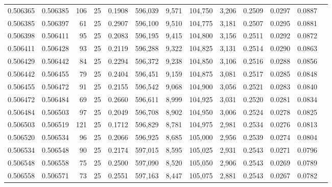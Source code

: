 \begin{tabular}{rrrrrrrrrrrrr}
0.506365 & 0.506385 & 106 &  25 &                                     0.1908 & 596,039 &   9,571 & 104,750 &   3,206 & 0.2509 & 0.0297 & 0.0887 \\
0.506385 & 0.506397 &  61 &  25 &                                     0.2907 & 596,100 &   9,510 & 104,775 &   3,181 & 0.2507 & 0.0295 & 0.0881 \\
0.506398 & 0.506411 &  95 &  25 &                                     0.2083 & 596,195 &   9,415 & 104,800 &   3,156 & 0.2511 & 0.0292 & 0.0872 \\
0.506411 & 0.506428 &  93 &  25 &                                     0.2119 & 596,288 &   9,322 & 104,825 &   3,131 & 0.2514 & 0.0290 & 0.0863 \\
0.506429 & 0.506442 &  84 &  25 &                                     0.2294 & 596,372 &   9,238 & 104,850 &   3,106 & 0.2516 & 0.0288 & 0.0856 \\
0.506442 & 0.506455 &  79 &  25 &                                     0.2404 & 596,451 &   9,159 & 104,875 &   3,081 & 0.2517 & 0.0285 & 0.0848 \\
0.506455 & 0.506472 &  91 &  25 &                                     0.2155 & 596,542 &   9,068 & 104,900 &   3,056 & 0.2521 & 0.0283 & 0.0840 \\
0.506472 & 0.506484 &  69 &  25 &                                     0.2660 & 596,611 &   8,999 & 104,925 &   3,031 & 0.2520 & 0.0281 & 0.0834 \\
0.506484 & 0.506503 &  97 &  25 &                                     0.2049 & 596,708 &   8,902 & 104,950 &   3,006 & 0.2524 & 0.0278 & 0.0825 \\
0.506503 & 0.506519 & 121 &  25 &                                     0.1712 & 596,829 &   8,781 & 104,975 &   2,981 & 0.2534 & 0.0276 & 0.0813 \\
0.506520 & 0.506534 &  96 &  25 &                                     0.2066 & 596,925 &   8,685 & 105,000 &   2,956 & 0.2539 & 0.0274 & 0.0804 \\
0.506534 & 0.506548 &  90 &  25 &                                     0.2174 & 597,015 &   8,595 & 105,025 &   2,931 & 0.2543 & 0.0271 & 0.0796 \\
0.506548 & 0.506558 &  75 &  25 &                                     0.2500 & 597,090 &   8,520 & 105,050 &   2,906 & 0.2543 & 0.0269 & 0.0789 \\
0.506558 & 0.506571 &  73 &  25 &                                     0.2551 & 597,163 &   8,447 & 105,075 &   2,881 & 0.2543 & 0.0267 & 0.0782 \\

\end{tabular}
